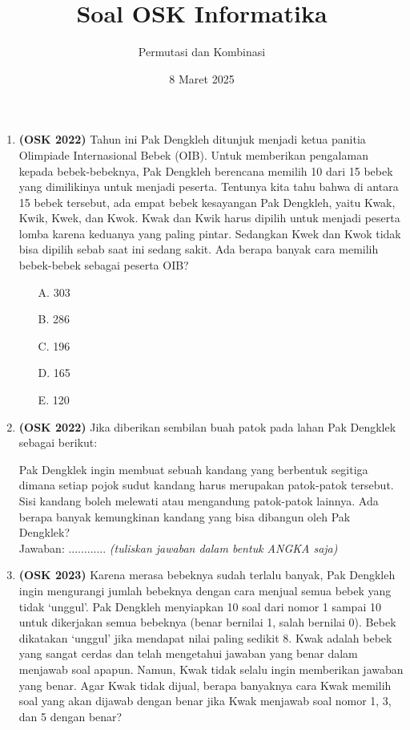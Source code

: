 \documentclass[a4paper]{article}
\title{Soal OSK Informatika}
\author{Permutasi dan Kombinasi}
\date{8 Maret 2025}
\begin{document}
\maketitle

\begin{enumerate}
  \item\textbf{(OSK 2022)} Tahun ini Pak Dengkleh ditunjuk menjadi ketua panitia Olimpiade Internasional Bebek (OIB). Untuk memberikan pengalaman kepada bebek-bebeknya, Pak Dengkleh berencana memilih 10 dari 15 bebek yang dimilikinya untuk menjadi peserta. Tentunya kita tahu bahwa di antara 15 bebek tersebut, ada empat bebek kesayangan Pak Dengkleh, yaitu Kwak, Kwik, Kwek, dan Kwok. Kwak dan Kwik harus dipilih untuk menjadi peserta lomba karena keduanya yang paling pintar. Sedangkan Kwek dan Kwok tidak bisa dipilih sebab saat ini sedang sakit. Ada berapa banyak cara memilih bebek-bebek sebagai peserta OIB?

  \begin{itemize}
      \item[A.] 303
      \item[B.] 286
      \item[C.] 196
      \item[D.] 165
      \item[E.] 120
  \end{itemize}

  \item\textbf{(OSK 2022)} Jika diberikan sembilan buah patok pada lahan Pak Dengklek sebagai berikut:

\begin{center}
\end{center}

Pak Dengklek ingin membuat sebuah kandang yang berbentuk segitiga dimana setiap pojok sudut kandang harus merupakan patok-patok tersebut. Sisi kandang boleh melewati atau mengandung patok-patok lainnya. Ada berapa banyak kemungkinan kandang yang bisa dibangun oleh Pak Dengklek?\\
Jawaban: ............ \textit{(tuliskan jawaban dalam bentuk ANGKA saja)}

  \item\textbf{(OSK 2023)} Karena merasa bebeknya sudah terlalu banyak, Pak Dengkleh ingin mengurangi jumlah bebeknya dengan cara menjual semua bebek yang tidak ‘unggul’. Pak Dengkleh menyiapkan 10 soal dari nomor 1 sampai 10 untuk dikerjakan semua bebeknya (benar bernilai 1, salah bernilai 0). Bebek dikatakan `unggul' jika mendapat nilai paling sedikit 8. Kwak adalah bebek yang sangat cerdas dan telah mengetahui jawaban yang benar dalam menjawab soal apapun. Namun, Kwak tidak selalu ingin memberikan jawaban yang benar. Agar Kwak tidak dijual, berapa banyaknya cara Kwak memilih soal yang akan dijawab dengan benar jika Kwak menjawab soal nomor 1, 3, dan 5 dengan benar?


\end{enumerate}
\end{document}
